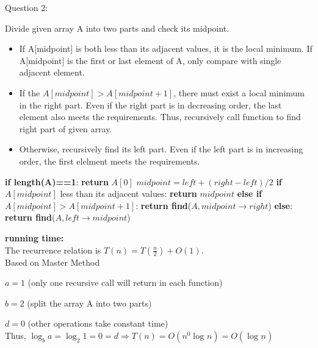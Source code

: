 \documentclass[12pt]{article}
\begin{document}
\pagebreak
\noindent
\large Question 2: \vspace{5mm} \par
\normalsize 
Divide given array A into two parts and check its midpoint. 
\begin{itemize}
  \item If A[midpoint] is both less than its adjacent values, it is the local minimum. If A[midpoint] is the first or last element of A, only compare with single adjacent element.
  \item If the $A[midpoint] >  A[midpoint+1]$, there must exist a local minimum in the right part. Even if the right part is in decreasing order, the last element also meets the requirements. 
	Thus, recursively call function to find right part of given array. 
  \item Otherwise, recursively find its left part. Even if the left part is in increasing order, the first elelment meets the requirements.
\end{itemize}


\begin{algorithm}
\begin{algorithmic}
  \State \textbf{if length(A)==1}:
  \State \hspace{0.8cm} \textbf{return} $A[0]$
  \State \textbf{}$midpoint = left + (right - left) / 2$
  \State \textbf{if} $A[midpoint]$ less than its adjacent values:
  \State \hspace{0.8cm}  \textbf{return} $midpoint$
  \State \textbf{else if} $A[midpoint] > A[midpoint + 1]$:
  \State \hspace{0.8cm}  \textbf{return find}($A, midpoint \rightarrow right$)
  \State \textbf{else}:
  \State \hspace{0.8cm} \textbf{return find}($A, left \rightarrow midpoint$)
\EndFunction
\end{algorithmic}
\end{algorithm}

\textbf{running time:} \\
The recurrence relation is $T(n) = T(\frac{n}{2}) + O(1)$.\\
Based on Master Method \par
$a = 1$  (only one recursive call will return in each function) \par
$b = 2$  (split the array A into two parts) \par
$d = 0$ (other operations take constant time)\\ 
Thus, $\log_{b}{a} = \log_{2}{1} = 0 = d \Rightarrow T(n) = O({n^0}{\log_{}{n}}) = O(\log_{}{n})$  
\end{document}
